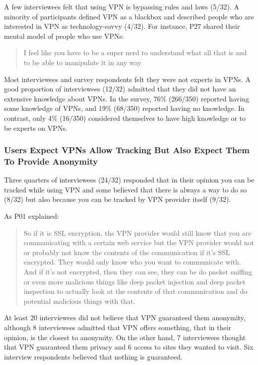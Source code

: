A few interviewees felt that using VPN is
bypassing rules and laws (5/32). A minority of participants defined VPN as a blackbox and described people who are
interested in VPN as technology-savvy (4/32). For instance, P27 shared their mental model of
people who use VPNs: \begin{quote}I feel like you have to be a super nerd to  understand what all that is and to be able to manipulate it in any
way\end{quote}

Most interviewees and survey respondents felt they were not experts in VPNs. A good proportion of interviewees (12/32) admitted that they did not have an extensive knowledge
about VPNs. In the survey, 76\% (266/350) reported having some knowledge of
VPNs, and 19\% (68/350) reported having no knowledge. In contrast, only 4\%
(16/350) considered themselves to have high knowledge or to be experts on
VPNs.




\subsubsection{Users Expect VPNs Allow Tracking But Also Expect Them To Provide Anonymity} 
Three quarters of interviewees (24/32) responded that in their opinion you can be tracked
while using VPN and some believed that there is always a way to do so
(8/32) but also because you can be tracked by VPN provider itself (9/32). 

As P01 explained:

\begin{quote}So if it is SSL encryption, the VPN provider would still know
that you are communicating with a certain web service but the VPN provider
would not or probably not know the contents of the communication if it's SSL
encrypted. They would only know who you want to communicate with. And if it's
not encrypted, then they can see, they can be do packet sniffing or even more
malicious things like deep packet injection and deep packet inspection to
actually look at the contents of that communication and do potential malicious
things with that. \end{quote}

At least 20 interviewees did not
believe that VPN guaranteed them anonymity, although 8 interviewees admitted
that VPN offers something, that in their opinion, is the closest to anonymity.
On the other hand, 7 interviewees thought that VPN guaranteed them privacy and
6 access to sites they wanted to visit. Six interview respondents believed
that nothing is guaranteed.

